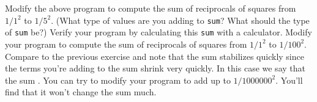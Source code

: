 Modify the above program to compute the sum of reciprocals of squares from $1/1^{2}$ to $1/5^{2}$. (What type of values are you adding to \texttt{sum}? What should the type of \texttt{sum} be?) Verify your program by calculating this \texttt{sum} with a calculator. Modify your program to compute the sum of reciprocals of squares from $1/1^{2}$ to $1/100^{2}$. Compare to the previous exercise and note that the sum stabilizes quickly since the terms you're adding to the sum shrink very quickly. In this case we say that the sum . You can try to modify your program to add up to $1/1000000^{2}$. You'll find that it won't change the sum much.

